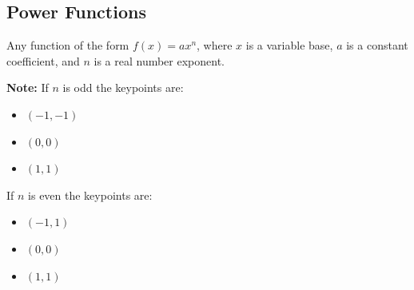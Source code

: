 \subsection{Power Functions}
\begin{definition}
  Any function of the form $f(x) = ax^n$, where $x$ is a variable base, $a$ is a constant coefficient, and $n$ is a real number exponent.
\end{definition}

\textbf{Note: } If $n$ is odd the keypoints are:
\begin{itemize}
\item $(-1, -1)$
\item $(0, 0)$
\item $(1, 1)$
\end{itemize}
If $n$ is even the keypoints are:
\begin{itemize}
\item $(-1, 1)$
\item $(0, 0)$
\item $(1, 1)$
\end{itemize}


